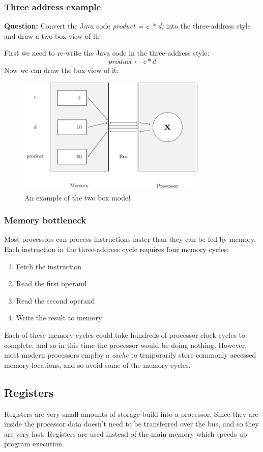 \documentclass{article}
\begin{document}
\subsubsection{Three address example}
{\bf Question:} Convert the Java code {\it product = c * d;} into the three-address style and draw a two box view of it.

First we need to re-write the Java code in the three-address style:
\[
	product \leftarrow c * d
\]
Now we can draw the box view of it:

\begin{figure}[ht!]
	\centering
	\includegraphics[width=90mm]{two_box_model_diagram.pdf}
	\caption{An example of the two box model}
	\label{overflow}
\end{figure}

\subsubsection{Memory bottleneck}
Most processors can process instructions faster than they can be fed by memory. Each instruction in the three-address cycle requires four memory cycles:

\begin{enumerate}
    \item Fetch the instruction
    \item Read the first operand
    \item Read the second operand
    \item Write the result to memory
\end{enumerate}

Each of these memory cycles could take hundreds of processor clock cycles to complete, and so in this time the processor would be doing nothing. However, most modern processors employ a {\it cache} to temporarily store commonly accessed memory locations, and so avoid some of the memory cycles. 

\subsection{Registers}
Registers are very small amounts of storage build into a processor. Since they are inside the processor data doesn't need to be transferred over the bus, and so they are very fast. Registers are used instead of the main memory which speeds up program execution.
\end{document}
